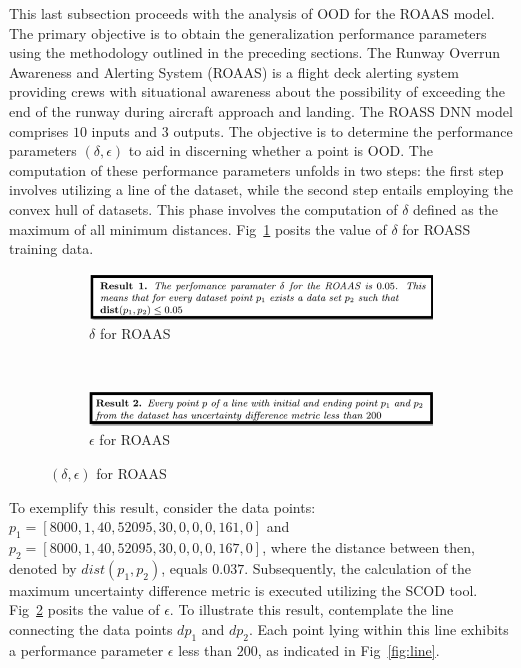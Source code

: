 This last subsection proceeds with the analysis of OOD for the ROAAS model. The primary objective is to obtain the generalization performance parameters using the methodology outlined in the preceding sections. The Runway Overrun Awareness and Alerting System (ROAAS) is a flight deck alerting system providing crews with situational awareness about the possibility of exceeding the end of the runway during aircraft approach and landing. The ROASS DNN model comprises $10$ inputs and $3$ outputs. The objective is to determine the performance parameters 
$(\delta, \epsilon)$ to aid in discerning whether a point is OOD. The computation of these performance parameters unfolds in two steps: the first step involves utilizing a line of the dataset, while the second step entails employing the convex hull of datasets. This phase involves the computation of $\delta$ defined as the maximum of all minimum distances. Fig~\ref{fig:deltaR} posits the value of $\delta$ for ROASS training data. 
\begin{figure}
\begin{subfigure}{.24\textwidth}
    \includegraphics[width=2.0\linewidth]{Fig/OOD_result1.png}  
    \caption{$\delta$ for ROAAS}
    \label{fig:deltaR}
\end{subfigure}
\\
\begin{subfigure}{.24\textwidth}
    \includegraphics[width=2.0\linewidth]{Fig/OOD_result2.png}  
    \caption{$\epsilon$ for ROAAS}
    \label{fig:epsilonR}
 \end{subfigure}
\caption{$(\delta,\epsilon)$ for ROAAS}
\label{FIGURE LABEL}
\end{figure}
To exemplify this result, consider the data points: $p_1= [8000, 1, 40, 52095, 30, 0,0,0, 161, 0]$ and $p_2= [8000, 1, 40, 52095, 30, 0, 0, 0, 167, 0]$, where the distance between then, denoted by $dist(p_1, p_2)$, equals $0.037$. Subsequently, the calculation of the maximum uncertainty difference metric is executed utilizing the SCOD tool. Fig~\ref{fig:epsilonR} posits the value of $\epsilon$.  To illustrate this result, contemplate the line connecting the data points $dp_1$ and $dp_2$. Each point lying within this line exhibits a performance parameter $\epsilon$ less than $200$, as indicated in Fig~\ref{fig:line}.
